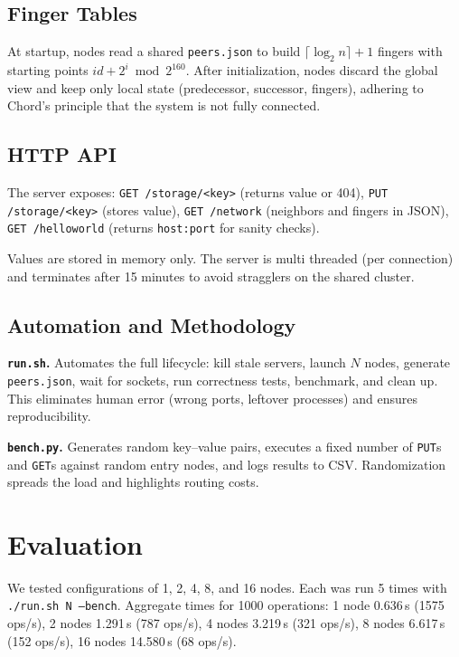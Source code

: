 \documentclass[conference]{IEEEtran}
\begin{document}
\subsection{Finger Tables}
At startup, nodes read a shared \texttt{peers.json} to build $\lceil \log_2 n \rceil + 1$ fingers with starting points $id + 2^i \bmod 2^{160}$. After initialization, nodes discard the global view and keep only local state (predecessor, successor, fingers), adhering to Chord’s principle that the system is not fully connected.

\subsection{HTTP API}
The server exposes:  
\texttt{GET /storage/<key>} (returns value or 404),  
\texttt{PUT /storage/<key>} (stores value),  
\texttt{GET /network} (neighbors and fingers in JSON),  
\texttt{GET /helloworld} (returns \texttt{host:port} for sanity checks).  

Values are stored in memory only. The server is multi threaded (per connection) and terminates after 15 minutes to avoid stragglers on the shared cluster.

\subsection{Automation and Methodology}
\textbf{\texttt{run.sh}.} Automates the full lifecycle: kill stale servers, launch $N$ nodes, generate \texttt{peers.json}, wait for sockets, run correctness tests, benchmark, and clean up. This eliminates human error (wrong ports, leftover processes) and ensures reproducibility.

\textbf{\texttt{bench.py}.} Generates random key–value pairs, executes a fixed number of \texttt{PUT}s and \texttt{GET}s against random entry nodes, and logs results to CSV. Randomization spreads the load and highlights routing costs.

\section{Evaluation}
We tested configurations of 1, 2, 4, 8, and 16 nodes. Each was run 5 times with \texttt{./run.sh N --bench}. Aggregate times for 1000 operations: 1 node 0.636\,s (1575 ops/s), 2 nodes 1.291\,s (787 ops/s), 4 nodes 3.219\,s (321 ops/s), 8 nodes 6.617\,s (152 ops/s), 16 nodes 14.580\,s (68 ops/s).
\end{document}

